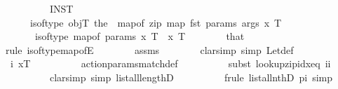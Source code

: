 \begin{isabellebody}
%
\isadelimproof
\ \ %
\endisadelimproof
%
\isatagproof
{}\isamarkupfalse%
\ {\isacharminus}{\kern0pt}\isanewline
\ \ \ \ \isamarkupfalse%
\ INST{\isacharcolon}{\kern0pt}\isanewline
\ \ \ \ \ \ {\isachardoublequoteopen}is{\isacharunderscore}{\kern0pt}of{\isacharunderscore}{\kern0pt}type\ objT\ {\isacharparenleft}{\kern0pt}{\isacharparenleft}{\kern0pt}the\ {\isasymcirc}\ map{\isacharunderscore}{\kern0pt}of\ {\isacharparenleft}{\kern0pt}zip\ {\isacharparenleft}{\kern0pt}map\ fst\ params{\isacharparenright}{\kern0pt}\ args{\isacharparenright}{\kern0pt}{\isacharparenright}{\kern0pt}\ x{\isacharparenright}{\kern0pt}\ T{\isachardoublequoteclose}\isanewline
\ \ \ \ \ \ \ {\isachardoublequoteopen}is{\isacharunderscore}{\kern0pt}of{\isacharunderscore}{\kern0pt}type\ {\isacharparenleft}{\kern0pt}map{\isacharunderscore}{\kern0pt}of\ params{\isacharparenright}{\kern0pt}\ x\ T{\isachardoublequoteclose}\ \ x\ T\isanewline
\ \ \ \ \ \ \isamarkupfalse%
\ that\isanewline
\ \ \ \ \ \ \isamarkupfalse%
\ {\isacharparenleft}{\kern0pt}rule\ is{\isacharunderscore}{\kern0pt}of{\isacharunderscore}{\kern0pt}type{\isacharunderscore}{\kern0pt}map{\isacharunderscore}{\kern0pt}ofE{\isacharparenright}{\kern0pt}\isanewline
\ \ \ \ \ \ \isamarkupfalse%
\ assms\isanewline
\ \ \ \ \ \ \isamarkupfalse%
\ {\isacharparenleft}{\kern0pt}clarsimp\ simp{\isacharcolon}{\kern0pt}\ Let{\isacharunderscore}{\kern0pt}def{\isacharparenright}{\kern0pt}\isanewline
\ \ \ \ \ \ \isamarkupfalse%
\ \ i\ xT\isanewline
\ \ \ \ \ \ \ \ \isamarkupfalse%
\ action{\isacharunderscore}{\kern0pt}params{\isacharunderscore}{\kern0pt}match{\isacharunderscore}{\kern0pt}def\isanewline
\ \ \ \ \ \ \ \ \isamarkupfalse%
\ {\isacharparenleft}{\kern0pt}subst\ lookup{\isacharunderscore}{\kern0pt}zip{\isacharunderscore}{\kern0pt}idx{\isacharunderscore}{\kern0pt}eq{\isacharbrackleft}{\kern0pt}\ i{\isacharequal}{\kern0pt}i{\isacharbrackright}{\kern0pt}{\isacharsemicolon}{\kern0pt}\isanewline
\ \ \ \ \ \ \ \ \ \ {\isacharparenleft}{\kern0pt}clarsimp\ simp{\isacharcolon}{\kern0pt}\ list{\isacharunderscore}{\kern0pt}all{}{\isacharunderscore}{\kern0pt}lengthD{\isacharparenright}{\kern0pt}{\isacharquery}{\kern0pt}{\isacharparenright}{\kern0pt}\isanewline
\ \ \ \ \ \ \ \ \isamarkupfalse%
\ {\isacharparenleft}{\kern0pt}frule\ list{\isacharunderscore}{\kern0pt}all{}{\isacharunderscore}{\kern0pt}nthD{}{\isacharbrackleft}{\kern0pt}\ p{\isacharequal}{\kern0pt}i{\isacharbrackright}{\kern0pt}{\isacharsemicolon}{\kern0pt}\ simp{\isacharquery}{\kern0pt}{\isacharparenright}{\kern0pt}\isanewline

\end{isabellebody}
